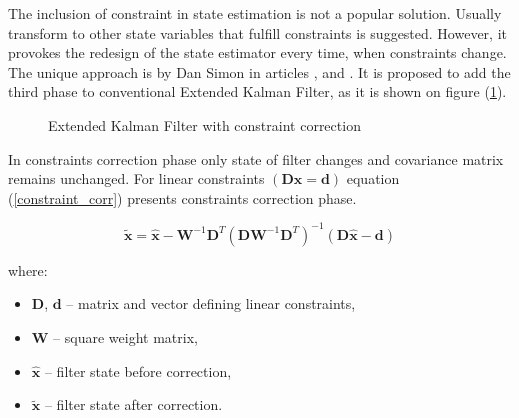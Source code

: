 The inclusion of constraint in state estimation is not a popular solution. Usually transform to other state variables that fulfill constraints is suggested. However, it provokes the redesign of the state estimator every time, when constraints change. The unique approach is by Dan Simon in articles \cite{simon}, \cite{simon2010kalman} and \cite{simon2006kalman}. It is proposed to add the third phase to conventional Extended Kalman Filter, as it is shown on figure (\ref{ekf_three_phases}).

\begin{figure}[!h]
	\begin{center}
	\end{center}
	\caption{Extended Kalman Filter with constraint correction}
	\label{ekf_three_phases}
\end{figure}

In constraints correction phase only state of filter changes and covariance matrix remains unchanged. For linear constraints $\left( \bm{D} \bm{x} = \bm{d}  \right)$ equation (\ref{constraint_corr}) presents constraints correction phase.

\begin{equation}
	\bm{\tilde{x}} = \bm{\hat{x}} - \bm{W}^{-1} \bm{D}^T \left( \bm{D} \bm{W}^{-1} \bm{D}^T \right)^{-1} \left( \bm{D} \bm{\hat{x}} - \bm{d}  \right)
	\label{constraint_corr}
\end{equation}

where:
\begin{itemize}
	\item $\bm{D}$, $\bm{d}$ -- matrix and vector defining linear constraints,
	\item $\bm{W}$ -- square weight matrix,
	\item $\bm{\hat{x}}$ -- filter state before correction,
	\item $\bm{\tilde{x}}$ -- filter state after correction.
\end{itemize}

